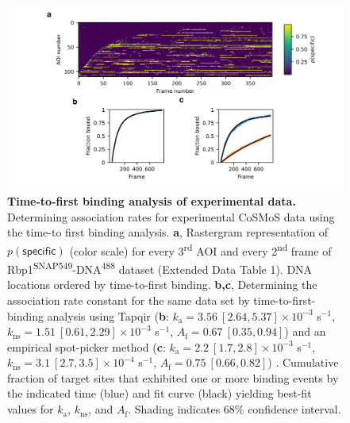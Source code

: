 \begin{figure}[t]
\centering
\includegraphics[width=\textwidth]{extended-data/figure4/figure3.png}
\caption{\textbf{Time-to-first binding analysis of experimental data.}  Determining association rates for experimental CoSMoS data using the time-to first binding analysis. \textbf{a}, Rastergram representation of $p(\mathsf{specific})$ (color scale) for every 3\textsuperscript{rd} AOI and every 2\textsuperscript{nd} frame of Rbp1\textsuperscript{SNAP549}-DNA\textsuperscript{488} dataset (Extended Data Table 1). DNA locations ordered by time-to-first binding. \textbf{b,c}, Determining the association rate constant for the same data set by  time-to-first-binding analysis using Tapqir (\textbf{b}: $k_\mathrm{a} = 3.56 \: [2.64, 5.37] \times 10^{-3}$ s$^{-1}$, $k_\mathrm{ns} = 1.51 \: [0.61, 2.29] \times 10^{-3}$ s$^{-1}$, $A_\mathrm{f} = 0.67 \: [0.35, 0.94]$) and an empirical spot-picker method (\textbf{c}: $k_\mathrm{a} = 2.2 \: [1.7, 2.8] \times 10^{-3}$ s$^{-1}$, $k_\mathrm{ns} = 3.1 \: [2.7, 3.5] \times 10^{-4}$ s$^{-1}$, $A_\mathrm{f} = 0.75 \: [0.66, 0.82]$) \cite{Rosen2020-zn}.   Cumulative fraction of target sites that exhibited one or more binding events by the indicated time (blue) and fit curve (black) yielding best-fit values for $k_\mathrm{a}$, $k_\mathrm{ns}$, and $A_\mathrm{f}$. Shading indicates 68\% confidence interval.
}
\label{fig:rpb1snap549}
\end{figure}
\pagebreak

